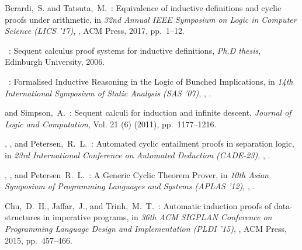 \begin{thebibliography}{99}
  Berardi,~S. and Tatsuta,~M.~: 
  Equivalence of inductive definitions and cyclic proofs under arithmetic,
  in {\it 32nd Annual IEEE Symposium on Logic in Computer Science (LICS '17)},
  , 
  ACM Press,
  2017,
  pp.~1--12.
  
  \brotherston~:
  Sequent calculus proof systems for inductive definitions,
  {\it Ph.D thesis},
  Edinburgh University,
  2006.
  
  \brotherston~:
  Formalised Inductive Reasoning in the Logic of Bunched Implications,
  in {\it 14th International Symposium of Static Analysis (SAS '07)},
  ,
  . 

  \brotherston and Simpson,~A.~:
  Sequent calculi for induction and infinite descent,
  {\it Journal of Logic and Computation},
  Vol. 21 (6) (2011),
  pp.~1177--1216.

  \brotherston, \distefano, and Petersen,~R.~L.~:
  Automated cyclic entailment proofs in separation logic,
  in {\it 23rd International Conference on Automated Deduction (CADE-23)}, 
  ,
  .     

  \brotherston, \gorogiannis, and Petersen~R.~L.~:
  A Generic Cyclic Theorem Prover,
  in {\it 10th Asian Symposium of Programming Languages and Systems (APLAS '12)}, 
  ,
  .     



  Chu,~D.~H., Jaffar,~J., and Trinh,~M.~T.~: 
  Automatic induction proofs of data-structures in imperative programs,
  in {\it 36th ACM SIGPLAN Conference on Programming Language Design and Implementation (PLDI '15)},
  ,
  ACM Press,
  2015,
  pp.~457--466.


\end{thebibliography}
